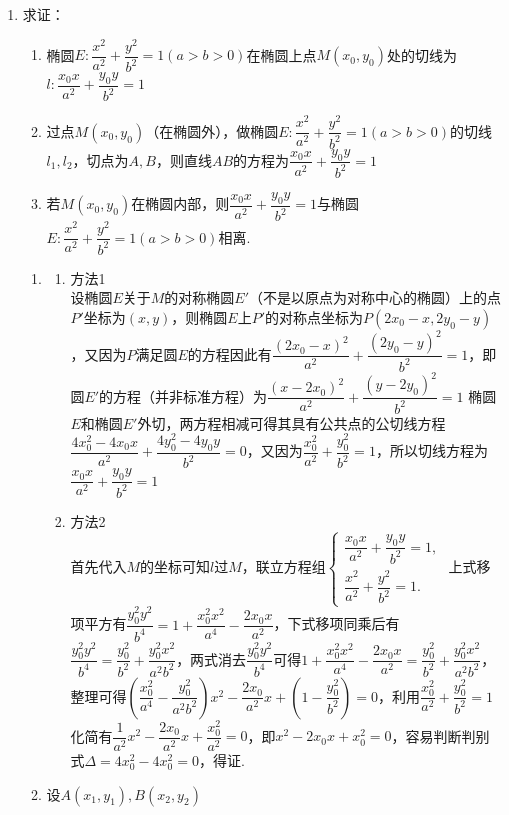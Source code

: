 \begin{enumerate}
    \item 求证：
    \begin{enumerate}
        \item 椭圆$E: \dfrac{x^2}{a^2}+\dfrac{y^2}{b^2} = 1(a > b > 0)$在椭圆上点$M(x_0, y_0)$处的切线为$l:\dfrac{x_0x}{a^2}+\dfrac{y_0y}{b^2} = 1$
        \item 过点$M(x_0, y_0)$（在椭圆外），做椭圆$E: \dfrac{x^2}{a^2}+\dfrac{y^2}{b^2} = 1(a > b > 0)$的切线$l_1, l_2$，切点为$A, B$，则直线$AB$的方程为$\dfrac{x_0x}{a^2}+\dfrac{y_0y}{b^2} = 1$
        \item 若$M(x_0, y_0)$在椭圆内部，则$\dfrac{x_0x}{a^2}+\dfrac{y_0y}{b^2} = 1$与椭圆$E: \dfrac{x^2}{a^2}+\dfrac{y^2}{b^2} = 1(a > b > 0)$相离.
    \end{enumerate}
    \begin{jieda}
        \begin{enumerate}
            \item 
            \begin{enumerate}
                \item 方法1 \\
                设椭圆$E$关于$M$的对称椭圆$E'$（不是以原点为对称中心的椭圆）上的点$P'$坐标为$(x, y)$，则椭圆$E$上$P'$的对称点坐标为$P(2x_0 - x, 2y_0-y)$，又因为$P$满足圆$E$的方程因此有$\dfrac{(2x_0 - x)^2}{a^2}+\dfrac{(2y_0-y)^2}{b^2} = 1$，即圆$E'$的方程（并非标准方程）为$\dfrac{(x-2x_0)^2}{a^2}+\dfrac{(y-2y_0)^2}{b^2} = 1$
                椭圆$E$和椭圆$E'$外切，两方程相减可得其具有公共点的公切线方程$\dfrac{4x_0^2-4x_0x}{a^2}+\dfrac{4y_0^2-4y_0y}{b^2} = 0$，又因为$\dfrac{x_0^2}{a^2}+\dfrac{y_0^2}{b^2} = 1$，所以切线方程为$\dfrac{x_0x}{a^2}+\dfrac{y_0y}{b^2} = 1$
                \item 方法2 \\
                首先代入$M$的坐标可知$l$过$M$，联立方程组$\left\{  \begin{array}{l} 
                \dfrac{x_0x}{a^2}+\dfrac{y_0y}{b^2} = 1, \\  
                \dfrac{x^2}{a^2}+\dfrac{y^2}{b^2} = 1. \end{array}\right.$ 上式移项平方有$\dfrac{y_0^2y^2}{b^4} = 1 + \dfrac{x_0^2x^2}{a^4}-\dfrac{2x_0x}{a^2}$，下式移项同乘后有$\dfrac{y_0^2y^2}{b^4} = \dfrac{y_0^2}{b^2}+\dfrac{y_0^2x^2}{a^2b^2}$，两式消去$\dfrac{y_0^2y^2}{b^4}$可得$1 + \dfrac{x_0^2x^2}{a^4} - \dfrac{2x_0x}{a^2} = \dfrac{y_0^2}{b^2}+\dfrac{y_0^2x^2}{a^2b^2}$，整理可得$\left(\dfrac{x_0^2}{a^4}-\dfrac{y_0^2}{a^2b^2}\right)x^2-\dfrac{2x_0}{a^2}x + \left(1-\dfrac{y_0^2}{b^2}\right) = 0$，利用$\dfrac{x_0^2}{a^2}+\dfrac{y_0^2}{b^2} = 1$化简有$\dfrac{1}{a^2}x^2-\dfrac{2x_0}{a^2}x + \dfrac{x_0^2}{a^2} = 0$，即$x^2-2x_0x + x_0^2 = 0$，容易判断判别式$\Delta = 4x_0^2 - 4x_0^2 = 0$，得证.
            \end{enumerate}
            \item 设$A(x_1, y_1), B(x_2, y_2)$
            

\end{enumerate}
\end{jieda}
\end{enumerate}
